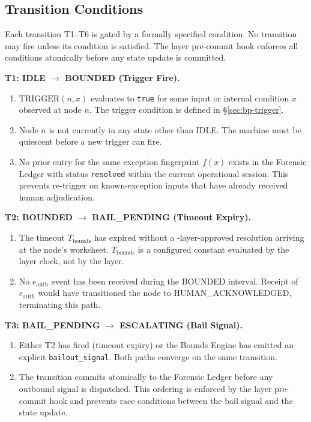 \subsection{Transition Conditions}
\label{sec:bp-transitions}

Each transition T1--T6 is gated by a formally specified condition. No transition may fire unless its condition is satisfied. The \fact{} layer pre-commit hook enforces all conditions atomically before any state update is committed.

\bigskip
\noindent\textbf{T1: IDLE $\rightarrow$ BOUNDED (Trigger Fire).}

\begin{enumerate}
    \item[(T1-C1)] $\text{TRIGGER}(n, x)$ evaluates to \texttt{true} for some input or internal condition $x$ observed at node $n$. The trigger condition is defined in \S\ref{sec:bp-trigger}.
    \item[(T1-C2)] Node $n$ is not currently in any state other than IDLE. The machine must be quiescent before a new trigger can fire.
    \item[(T1-C3)] No prior entry for the same exception fingerprint $f(x)$ exists in the Forensic Ledger with status \texttt{resolved} within the current operational session. This prevents re-trigger on known-exception inputs that have already received human adjudication.
\end{enumerate}

\bigskip
\noindent\textbf{T2: BOUNDED $\rightarrow$ BAIL\_PENDING (Timeout Expiry).}

\begin{enumerate}
    \item[(T2-C1)] The timeout $T_{\text{bounds}}$ has expired without a \fact-layer-approved resolution arriving at the node's worksheet. $T_{\text{bounds}}$ is a configured constant evaluated by the \fact{} layer clock, not by the \bounds{} layer.
    \item[(T2-C2)] No $e_{\text{auth}}$ event has been received during the BOUNDED interval. Receipt of $e_{\text{auth}}$ would have transitioned the node to HUMAN\_ACKNOWLEDGED, terminating this path.
\end{enumerate}

\bigskip
\noindent\textbf{T3: BAIL\_PENDING $\rightarrow$ ESCALATING (Bail Signal).}

\begin{enumerate}
    \item[(T3-C1)] Either T2 has fired (timeout expiry) or the Bounds Engine has emitted an explicit \texttt{bailout\_signal}. Both paths converge on the same transition.
    \item[(T3-C2)] The transition commits atomically to the Forensic Ledger before any outbound signal is dispatched. This ordering is enforced by the \fact{} layer pre-commit hook and prevents race conditions between the bail signal and the state update.
\end{enumerate}

